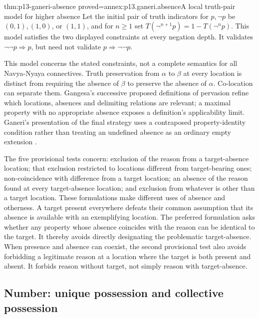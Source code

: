 

\begin{hblemma}{thm:p13-ganeri-absence}
 {proved=annex:p13.ganeri.absence}{A local truth-pair model for higher absence}
Let the initial pair of truth indicators for \(p,\neg p\) be
\((0,1),(1,0)\), or \((1,1)\), and for \(n\geq1\) set
\(T(\neg^{n+1}p)=1-T(\neg^n p)\).
This model satisfies the two displayed constraints at every negation depth.
It validates \(\neg\neg p\Rightarrow p\), but need not validate
\(p\Rightarrow\neg\neg p\).
\end{hblemma}

This model concerns the stated constraints, not a complete semantics for
all Navya-Nyaya connectives. Truth preservation from \(\alpha\) to \(\beta\)
at every location is distinct from requiring the absence of \(\beta\)
to preserve the absence of \(\alpha\). Co-location can separate them.
Gangesa's successive proposed definitions of pervasion refine which
locations, absences and delimiting relations are relevant; a maximal
property with no appropriate absence exposes a definition's applicability
limit. Ganeri's presentation of the final strategy uses a contraposed
property-identity condition rather than treating an undefined absence
as an ordinary empty extension
\cite[pp.~385--387]{Ganeri2004IndianLogicPublished}.

The five provisional tests concern: exclusion of the reason from a
target-absence location; that exclusion restricted to locations different
from target-bearing ones; non-coincidence with difference from a target
location; an absence of the reason found at every target-absence location;
and exclusion from whatever is other than a target location.
These formulations make different uses of absence and otherness.
A target present everywhere defeats their common assumption that
its absence is available with an exemplifying location.
The preferred formulation asks whether any property whose absence
coincides with the reason can be identical to the target. It thereby
avoids directly designating the problematic target-absence.
When presence and absence can coexist, the second provisional test
also avoids forbidding a legitimate reason at a location where the
target is both present and absent. It forbids reason without target,
not simply reason with target-absence.

\subsection{Number: unique possession and collective possession}

